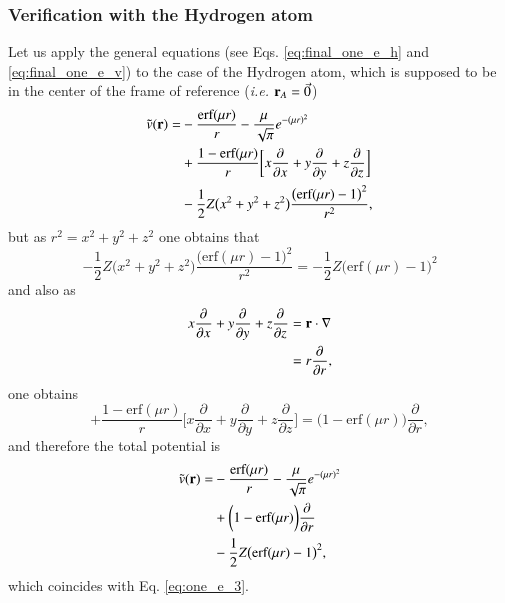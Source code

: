 \documentclass[aip,jcp,reprint,noshowkeys,superscriptaddress]{revtex4-1}
\newcommand{\deriv}[3]{\frac{\partial^{#3} #1}{\partial {#2}^{#3}}}
\begin{document}
\subsubsection{Verification with the Hydrogen atom}
Let us apply the general equations (see Eqs. \eqref{eq:final_one_e_h} and \eqref{eq:final_one_e_v}) to the case of the Hydrogen atom, which is supposed to be in the center of the frame of reference (\textit{i.e.} ${\bf r}_A = \vec{0}$)
\begin{equation}
 \begin{aligned}
  \tilde{v}({\bf r}) = & -\frac{\text{erf}(\mu r)}{r} - \frac{\mu}{\sqrt{\pi}} e^{-(\mu r)^2} \\
           &+  \frac{1 - \text{erf}(\mu r)}{r} \bigg[ x \deriv{}{x}{} + y \deriv{}{y}{} + z \deriv{}{z}{}\bigg] \\
           &- \frac{1}{2}Z \big(x^2 + y^2 + z^2 \big)  \frac{\big(\text{erf}(\mu r) - 1\big)^2}{r^2},
 \end{aligned}
\end{equation}
but as $r^2 = x^2+y^2+z^2$ one obtains that 
\begin{equation}
 - \frac{1}{2}Z \big(x^2 + y^2 + z^2 \big)  \frac{\big(\text{erf}(\mu r) - 1\big)^2}{r^2} = - \frac{1}{2}Z\big(\text{erf}(\mu r) - 1\big)^2
\end{equation}
and also as 
\begin{equation}
 \begin{aligned}
 x \deriv{}{x}{} + y \deriv{}{y}{} + z \deriv{}{z}{} & = {\bf r} \cdot \nabla \\
                                                     & = r \deriv{}{r}{},
 \end{aligned}
\end{equation}
one obtains 
\begin{equation}
           +  \frac{1 - \text{erf}(\mu r)}{r} \bigg[ x \deriv{}{x}{} + y \deriv{}{y}{} + z \deriv{}{z}{}\bigg] = \bigg(1 - \text{erf}(\mu r)\bigg)\deriv{}{r}{},
\end{equation}
and therefore the total potential is 
\begin{equation}
 \begin{aligned}
  \tilde{v}({\bf r}) = & -\frac{\text{erf}(\mu r)}{r} - \frac{\mu}{\sqrt{\pi}} e^{-(\mu r)^2} \\
           &+  \bigg(1 - \text{erf}(\mu r)\bigg)\deriv{}{r}{} \\
           &- \frac{1}{2}Z\big(\text{erf}(\mu r) - 1\big)^2,
 \end{aligned}
\end{equation}
which coincides with Eq. \eqref{eq:one_e_3}. 
\end{document}
